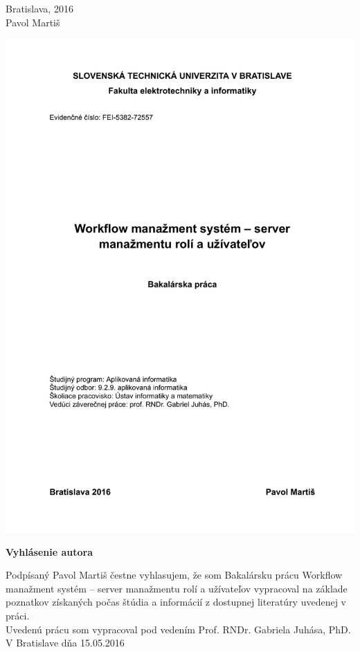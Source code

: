 \documentclass[12pt, oneside]{book}
\def\mfrok{2016}
\def\mfautor{Pavol Martiš}
\def\mfmiesto{Bratislava, \mfrok}
\begin{document}
\noindent \mfmiesto\\
\mfautor

\eject %





\newpage 
\thispagestyle{empty}
\hspace{-2cm}\includegraphics[width=1.1\textwidth]{images/zadanie}


\frontmatter


\setcounter{page}{3}
\newpage 
\noindent
\vfill
\begin{center}
	\LARGE \textbf{Vyhlásenie autora}  \\
\end{center}
Podpísaný Pavol Martiš čestne vyhlasujem, že som Bakalársku prácu Workflow manažment systém – server manažmentu rolí a užívateľov vypracoval na základe poznatkov získaných počas štúdia a informácií z dostupnej literatúry uvedenej v práci.\\
Uvedenú prácu som vypracoval pod vedením Prof. RNDr. Gabriela Juhása, PhD.
V Bratislave dňa 15.05.2016 \\\\\\
\end{document}
